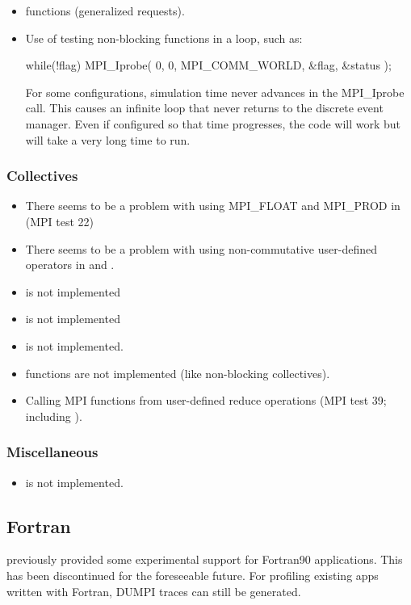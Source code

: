 \begin{itemize}
\item {} functions (generalized requests).
\item Use of testing non-blocking functions in a loop, such as:


\begin{CppCode}
while(!flag)
{
  MPI_Iprobe( 0, 0, MPI_COMM_WORLD, &flag, &status );
}
\end{CppCode}

For some configurations, simulation time never advances in the MPI\_Iprobe call. 
This causes an infinite loop that never returns to the discrete event manager. 
Even if configured so that time progresses, the code will work but will take a very long time to run.
	
\end{itemize}


\subsubsection{Collectives}
\label{subsubsec:issues:mpi:collectives}

\begin{itemize}
\item There seems to be a problem with using MPI\_FLOAT and MPI\_PROD in  (MPI test 22)
\item There seems to be a problem with using non-commutative user-defined operators in  and .
\item {} is not implemented
\item {} is not implemented
\item {} is not implemented.
\item {} functions are not implemented  (like non-blocking collectives).
\item Calling MPI functions from user-defined reduce operations (MPI test 39; including ).
\end{itemize}

\subsubsection{Miscellaneous}
\label{subsubsec:issues:mpi:misc}

\begin{itemize}
\item {} is not implemented.
\end{itemize}


\subsection{Fortran}
\label{subsec:issues:fortran}

\sstmacro previously provided some experimental support for Fortran90 applications. 
This has been discontinued for the foreseeable future.
For profiling existing apps written with Fortran, DUMPI traces can still be generated. 

